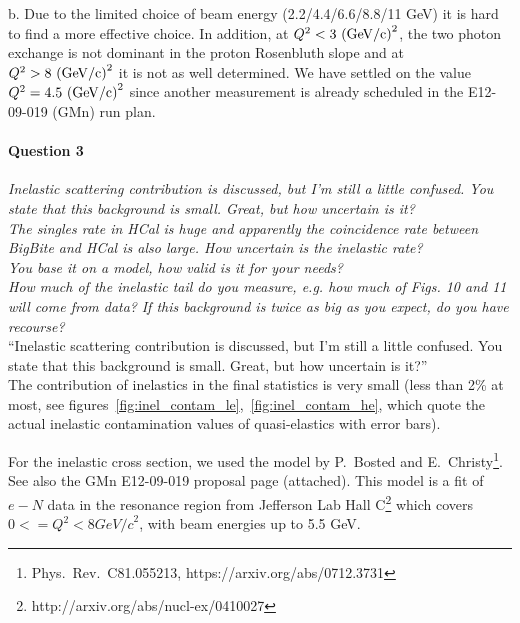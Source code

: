 \documentclass[11pt]{article}
\begin{document}
b. Due to the limited choice of beam energy (2.2/4.4/6.6/8.8/11 GeV) it is hard to find a
more effective choice. In addition, at  $Q^2 < 3~{\rm (GeV/c)}^2$, the two photon exchange is not dominant in the proton
Rosenbluth slope and at $Q^2 > 8~{\rm (GeV/c)}^2$ it is not as well determined. We have settled on the value
$Q^2 =4.5~{\rm (GeV/c)}^2$ since another measurement is already scheduled in the E12-09-019 (GMn) run plan.

\paragraph{Question 3}
{\it Inelastic scattering contribution is discussed, but I'm still a
little confused. You state that this background is small.
Great, but how uncertain is it?}\\
{\it The singles rate in HCal is huge and apparently the coincidence rate between BigBite and HCal is also large. 
How uncertain is the inelastic rate?}\\
{\it You base it on a model, how valid is it for your needs?}\\
{\it How much of the inelastic tail do you measure, e.g. how much of Figs. 10 and 11 will come from data?}
{\it If this background is twice as big as you expect, do you have recourse?}\\

\iffalse
``Inelastic scattering contribution is discussed, but I'm still a little confused. You state that this background is small. Great, but how uncertain is it?''\\

The contribution of inelastics in the final statistics is very small (less than 2\% at most, see figures~\ref{fig:inel_contam_le},~\ref{fig:inel_contam_he}, which quote the actual inelastic contamination values of quasi-elastics with error bars).

For the inelastic cross section, we used the model by P.~Bosted and E.~Christy\footnote{Phys.~Rev.~C81.055213, https://arxiv.org/abs/0712.3731}. See also the GMn E12-09-019 proposal page (attached).
This model is a fit of $e-N$ data in the resonance region from Jefferson Lab Hall C\footnote{http://arxiv.org/abs/nucl-ex/0410027} which covers $0<=Q^2<8 {GeV/c}^2$, with beam energies up to 5.5 GeV.
\end{document}
